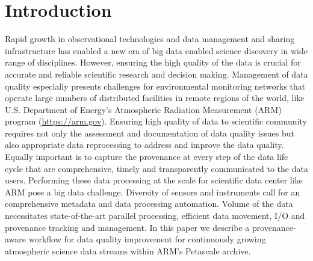 \section{Introduction}
Rapid growth in observational technologies and data management and
sharing infrastructure has enabled a new era of big data enabled science
discovery in wide range of disciplines. However, ensuring the high
quality of the data is crucial for accurate and reliable scientific
research and decision making. Management of data quality especially
presents challenges for environmental monitoring networks that operate
large numbers of distributed facilities in remote regions of the world,
like U.S. Department of Energy's Atmospheric Radiation Measurement (ARM)
program (\url{https://arm.gov}). Ensuring high quality of data to
scientific community requires not only  the assessment and
documentation of data quality issues but also appropriate data reprocessing to
address and improve the data quality.
Equally important is to capture the provenance at every step of
the data life cycle that are comprehensive, timely and transparently
communicated to the data users.
Performing these data processing at the scale for scientific data center
like ARM pose a big data challenge. Diversity of sensors and instruments
call for an comprehensive metadata and data processing automation.
Volume of the data necessitates state-of-the-art parallel processing,
efficient data movement, I/O and provenance tracking and management.
In this paper we describe a provenance-aware workflow for
data quality improvement for continuously growing
atmospheric science data streams within ARM's Petascale archive.



